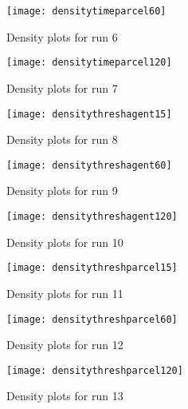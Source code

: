 \begin{figure}[H]
    \centering
    \texttt{[image: densitytimeparcel60]}
    \caption{Density plots for run 6}
    \label{fig:densitytimeparcel60}
\end{figure}

\begin{figure}[H]
    \centering
    \texttt{[image: densitytimeparcel120]}
    \caption{Density plots for run 7}
    \label{fig:densitytimeparcel120}
\end{figure}

\begin{figure}[H]
    \centering
    \texttt{[image: densitythreshagent15]}
    \caption{Density plots for run 8}
    \label{fig:densitythreshagent15}
\end{figure}

\begin{figure}[H]
    \centering
    \texttt{[image: densitythreshagent60]}
    \caption{Density plots for run 9}
    \label{fig:densitythreshagent60}
\end{figure}

\begin{figure}[H]
    \centering
    \texttt{[image: densitythreshagent120]}
    \caption{Density plots for run 10}
    \label{fig:densitythreshagent120}
\end{figure}

\begin{figure}[H]
    \centering
    \texttt{[image: densitythreshparcel15]}
    \caption{Density plots for run 11}
    \label{fig:densitythreshparcel15}
\end{figure}

\begin{figure}[H]
    \centering
    \texttt{[image: densitythreshparcel60]}
    \caption{Density plots for run 12}
    \label{fig:densitythreshparcel60}
\end{figure}

\begin{figure}[H]
    \centering
    \texttt{[image: densitythreshparcel120]}
    \caption{Density plots for run 13}
    \label{fig:densitythreshparcel120}
\end{figure}

